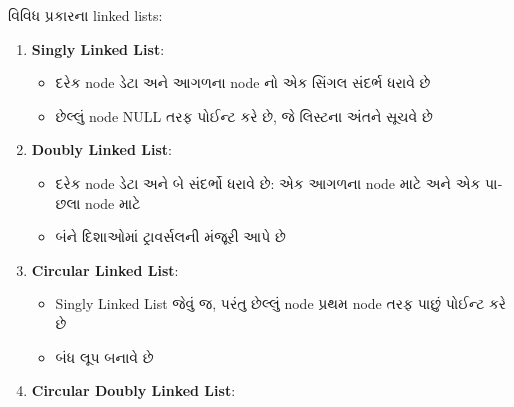 \documentclass[]{article}
\providecommand{\tightlist}{%
  \setlength{\itemsep}{0pt}\setlength{\parskip}{0pt}}
\begin{document}
\textgujarati{વિવિધ} \textgujarati{પ્રકારના} linked lists:

\begin{enumerate}
\def\labelenumi{\arabic{enumi}.}
\tightlist
\item
  \textbf{Singly Linked List}:

  \begin{itemize}
  \tightlist
  \item
    \textgujarati{દરેક} node \textgujarati{ડેટા} \textgujarati{અને}
    \textgujarati{આગળના} node \textgujarati{નો} \textgujarati{એક}
    \textgujarati{સિંગલ} \textgujarati{સંદર્ભ} \textgujarati{ધરાવે}
    \textgujarati{છે}
  \item
    \textgujarati{છેલ્લું} node NULL \textgujarati{તરફ} \textgujarati{પોઈન્ટ}
    \textgujarati{કરે} \textgujarati{છે}, \textgujarati{જે}
    \textgujarati{લિસ્ટના} \textgujarati{અંતને} \textgujarati{સૂચવે}
    \textgujarati{છે}
  \end{itemize}
\item
  \textbf{Doubly Linked List}:

  \begin{itemize}
  \tightlist
  \item
    \textgujarati{દરેક} node \textgujarati{ડેટા} \textgujarati{અને}
    \textgujarati{બે} \textgujarati{સંદર્ભો} \textgujarati{ધરાવે}
    \textgujarati{છે}: \textgujarati{એક} \textgujarati{આગળના} node
    \textgujarati{માટે} \textgujarati{અને} \textgujarati{એક}
    \textgujarati{પાછલા} node \textgujarati{માટે}
  \item
    \textgujarati{બંને} \textgujarati{દિશાઓમાં} \textgujarati{ટ્રાવર્સલની}
    \textgujarati{મંજૂરી} \textgujarati{આપે} \textgujarati{છે}
  \end{itemize}
\item
  \textbf{Circular Linked List}:

  \begin{itemize}
  \tightlist
  \item
    Singly Linked List \textgujarati{જેવું} \textgujarati{જ},
    \textgujarati{પરંતુ} \textgujarati{છેલ્લું} node \textgujarati{પ્રથમ} node
    \textgujarati{તરફ} \textgujarati{પાછું} \textgujarati{પોઈન્ટ}
    \textgujarati{કરે} \textgujarati{છે}
  \item
    \textgujarati{બંધ} \textgujarati{લૂપ} \textgujarati{બનાવે}
    \textgujarati{છે}
  \end{itemize}
\item
  \textbf{Circular Doubly Linked List}:


\end{enumerate}
\end{document}
